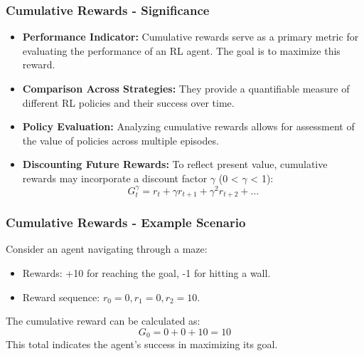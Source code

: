 \documentclass[aspectratio=169]{beamer}
\begin{document}
\begin{frame}[fragile]
    \frametitle{Cumulative Rewards - Significance}
    \begin{itemize}
        \item \textbf{Performance Indicator:} Cumulative rewards serve as a primary metric for evaluating the performance of an RL agent. The goal is to maximize this reward.
        
        \item \textbf{Comparison Across Strategies:} They provide a quantifiable measure of different RL policies and their success over time.
        
        \item \textbf{Policy Evaluation:} Analyzing cumulative rewards allows for assessment of the value of policies across multiple episodes.
        
        \item \textbf{Discounting Future Rewards:} To reflect present value, cumulative rewards may incorporate a discount factor \( \gamma \) (0 < \( \gamma \) < 1):
        \begin{equation}
            G_t^{\gamma} = r_t + \gamma r_{t+1} + \gamma^2 r_{t+2} + \ldots
        \end{equation}
    \end{itemize}
\end{frame}

\begin{frame}[fragile]
    \frametitle{Cumulative Rewards - Example Scenario}
    Consider an agent navigating through a maze:
    \begin{itemize}
        \item Rewards: +10 for reaching the goal, -1 for hitting a wall.
        \item Reward sequence: \( r_0 = 0, r_1 = 0, r_2 = 10 \).
    \end{itemize}
    The cumulative reward can be calculated as:
    \begin{equation}
        G_0 = 0 + 0 + 10 = 10
    \end{equation}
    This total indicates the agent's success in maximizing its goal.
\end{frame}
\end{document}
